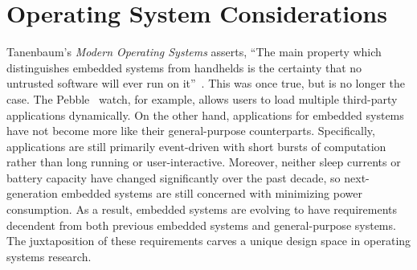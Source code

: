 \section{Operating System Considerations}
\label{os-considerations}

Tanenbaum's \emph{Modern Operating Systems} asserts, ``The main property which
distinguishes embedded systems from handhelds is the certainty that no untrusted
software will ever run on it''~\cite{tanenbaum}. This was once true, but is no
longer the case. The Pebble~\cite{pebble} watch, for example, allows users to
load multiple third-party applications dynamically. On the other hand,
applications for embedded systems have not become more like their
general-purpose counterparts. Specifically, applications are still primarily
event-driven with short bursts of computation rather than long running or
user-interactive. Moreover, neither sleep currents or battery capacity have
changed significantly over the past decade, so next-generation embedded systems
are still concerned with minimizing power consumption.  As a result, embedded
systems are evolving to have requirements decendent from both previous embedded
systems and general-purpose systems. The juxtaposition of these requirements
carves a unique design space in operating systems research.

%



